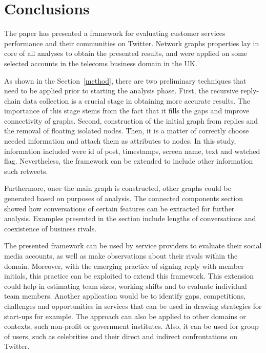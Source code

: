\documentclass[sigconf]{acmart}
\begin{document}
\section{Conclusions}\label{conclusions}

The paper has presented a framework for evaluating customer services
performance and their communities on Twitter. Network graphs
properties lay in core of all analyses to obtain the presented
results, and were applied on some selected accounts in the telecoms
business domain in the UK.

As shown in the Section~\ref{method}, there are two preliminary
techniques that need to be applied prior to starting the analysis
phase. First, the recursive reply-chain data collection is a crucial
stage in obtaining more accurate results. The importance of this stage
stems from the fact that it fills the gaps and improve connectivity of
graphs. Second, construction of the initial graph from replies and the
removal of floating isolated nodes. Then, it is a matter of correctly
choose needed information and attach them as attributes to nodes. In
this study, information included were id of post, timestamps, screen
name, text and watched flag. Nevertheless, the framework can be
extended to include other information such retweets.

Furthermore, once the main graph is constructed, other graphs could be
generated based on purposes of analysis. The connected components
section showed how conversations of certain features can be extracted
for further analysis. Examples presented in the section include
lengths of conversations and coexistence of business rivals.

The presented framework can be used by service providers to evaluate
their social media accounts, as well as make observations about their
rivals within the domain. Moreover, with the emerging practice of
signing reply with member initials, this practice can be exploited to
extend this framework. This extension could help in estimating team
sizes, working shifts and to evaluate individual team members. Another
application would be to identify gaps, competitions, challenges and
opportunities in services that can be used in drawing strategies for
start-ups for example. The approach can also be applied to other
domains or contexts, such non-profit or government institutes. Also,
it can be used for group of users, such as celebrities and their
direct and indirect confrontations on Twitter.





 
\end{document}
